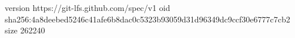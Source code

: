 version https://git-lfs.github.com/spec/v1
oid sha256:4a8deebed5246c41afe6b8dac0c5323b93059d31d96349dc9ccf30e6777c7cb2
size 262240

